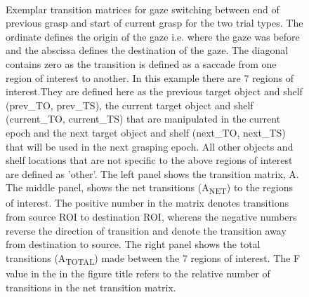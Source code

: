 \begin{figure}[h]
    \centering
     \\
    \caption[]{Exemplar transition matrices for gaze switching between end of previous grasp and start of current grasp for the two trial types. The ordinate defines the origin of the gaze i.e. where the gaze was before and the abscissa defines the destination of the gaze. The diagonal contains zero as the transition is defined as a saccade from one region of interest to another. In this example there are 7 regions of interest.They are defined here as the previous target object and shelf (prev\_TO, prev\_TS), the current target object and shelf (current\_TO, current\_TS) that are manipulated in the current epoch and the next target object and shelf (next\_TO, next\_TS) that will be used in the next grasping epoch. All other objects and shelf locations that are not specific to the above regions of interest are defined as 'other'. The left panel shows the transition matrix, A. The middle panel, shows the net transitions (A\textsubscript{NET}) to the regions of interest. The positive number in the matrix denotes transitions from source ROI to destination ROI, whereas the negative numbers reverse the direction of transition and denote the transition away from destination to source. The right panel shows the total transitions (A\textsubscript{TOTAL})  made between the 7 regions of interest. The F value in the in the figure title refers to the relative number of transitions in the net transition matrix.\\
}
\end{figure}
